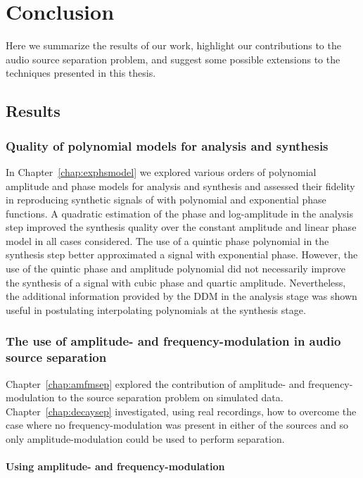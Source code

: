 \chapter{Conclusion\label{chap:conclusion}}

Here we summarize the results of our work, highlight our contributions to the
audio source separation problem, and suggest some possible extensions to the
techniques presented in this thesis.

\section{Results}

\subsection{Quality of polynomial models for analysis and synthesis}

In Chapter~\ref{chap:exphsmodel} we explored various orders of polynomial amplitude and
phase models for analysis and synthesis and assessed their fidelity in
reproducing synthetic signals of with polynomial and exponential phase functions. A
quadratic estimation of the phase and log-amplitude in the analysis step
improved the synthesis quality over the constant amplitude and linear phase
model in all cases considered. The use of a quintic phase
polynomial in the synthesis step better approximated a signal with exponential
phase. However, the use of the quintic phase and amplitude polynomial did not
necessarily improve the synthesis of a signal with cubic phase and quartic
amplitude. Nevertheless, the additional information provided by the DDM in the
analysis stage was shown useful in postulating interpolating polynomials at the
synthesis stage.

\subsection{The use of amplitude- and frequency-modulation in audio source separation}

Chapter~\ref{chap:amfmsep} explored the contribution of amplitude- and
frequency-modulation to the source separation problem on simulated data.
Chapter~\ref{chap:decaysep} investigated, using real recordings, how to overcome
the case where no frequency-modulation was present in either of the sources and
so only amplitude-modulation could be used to perform separation.

\subsubsection{Using amplitude- and
frequency-modulation}

